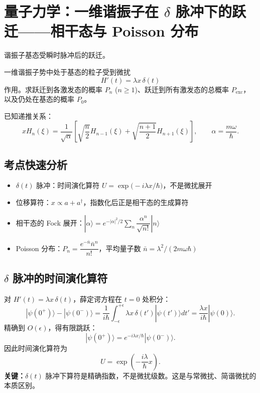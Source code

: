 
\section{量子力学：一维谐振子在 $\delta$ 脉冲下的跃迁——相干态与 Poisson 分布}
\label{sec:delta-pulse-ho}

\begin{modelbox}
谐振子基态受瞬时脉冲后的跃迁。

一维谐振子势中处于基态的粒子受到微扰
\[
H'(t) = \lambda x\, \delta(t)
\]
作用。求跃迁到各激发态的概率 $P_n$ ($n \geq 1$)、跃迁到所有激发态的总概率 $P_{\mathrm{exc}}$，以及仍处在基态的概率 $P_0$。

已知递推关系：
\[
x H_n(\xi) = \frac{1}{\sqrt{\alpha}} \left[ \sqrt{\frac{n}{2}} H_{n-1}(\xi) + \sqrt{\frac{n+1}{2}} H_{n+1}(\xi) \right], \qquad \alpha = \frac{m\omega}{\hbar}.
\]
\end{modelbox}

\subsection{考点快速分析}

\begin{tipbox}[考点快速分析]
\begin{itemize}
\item $\delta(t)$ 脉冲：时间演化算符 $U = \exp\!\bigl(-i\lambda x/\hbar\bigr)$，不是微扰展开
\item 位移算符：$x \propto a + a^\dagger$，指数化后正是相干态的生成算符
\item 相干态的 Fock 展开：$|\alpha\rangle = e^{-|\alpha|^2/2} \sum_n \dfrac{\alpha^n}{\sqrt{n!}} |n\rangle$
\item Poisson 分布：$P_n = \dfrac{e^{-\bar{n}} \bar{n}^n}{n!}$，平均量子数 $\bar{n} = \lambda^2/(2m\omega\hbar)$
\end{itemize}
\end{tipbox}

\subsection{$\delta$ 脉冲的时间演化算符}

\begin{derivationbox}
对 $H'(t) = \lambda x\, \delta(t)$，薛定谔方程在 $t=0$ 处积分：
\[
|\psi(0^+)\rangle - |\psi(0^-)\rangle = \frac{1}{i\hbar} \int_{-\epsilon}^{+\epsilon} \lambda x\, \delta(t') |\psi(t')\rangle dt' = \frac{\lambda x}{i\hbar} |\psi(0)\rangle.
\]
精确到 $O(\epsilon)$，得有限跳跃：
\[
|\psi(0^+)\rangle = e^{-i\lambda x/\hbar} |\psi(0^-)\rangle.
\]
因此时间演化算符为
\[
U = \exp\!\left( -\frac{i\lambda}{\hbar} x \right).
\]
\textbf{关键：}$\delta(t)$ 脉冲下算符是精确指数，不是微扰级数。这是与常微扰、简谐微扰的本质区别。
\end{derivationbox}

